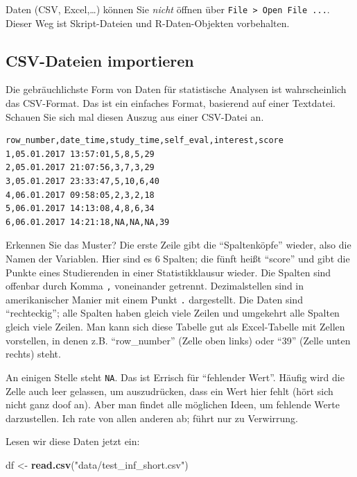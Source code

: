 \documentclass[12pt,ngerman,]{book}
\makeatletter
\newenvironment{Shaded}{\begin{snugshade}}{\end{snugshade}}
\newcommand{\KeywordTok}[1]{\textcolor[rgb]{0.13,0.29,0.53}{\textbf{{#1}}}}
\newcommand{\StringTok}[1]{\textcolor[rgb]{0.31,0.60,0.02}{{#1}}}
\newcommand{\NormalTok}[1]{{#1}}
\newenvironment{kframe}{%
\medskip{}
\setlength{\fboxsep}{.8em}
 \def\at@end@of@kframe{}%
 \ifinner\ifhmode%
  \def\at@end@of@kframe{\end{minipage}}%
  \begin{minipage}{\columnwidth}%
 \fi\fi%
 \def\FrameCommand##1{\hskip\@totalleftmargin \hskip-\fboxsep
 \colorbox{shadecolor}{##1}\hskip-\fboxsep
     \hskip-\linewidth \hskip-\@totalleftmargin \hskip\columnwidth}%
 \MakeFramed {\advance\hsize-\width
   \@totalleftmargin\z@ \linewidth\hsize
   \@setminipage}}%
 {\par\unskip\endMakeFramed%
 \at@end@of@kframe}
\renewenvironment{Shaded}{\begin{kframe}}{\end{kframe}}
\let\BeginKnitrBlock\begin \let\EndKnitrBlock\end
\makeatother
\begin{document}
\BeginKnitrBlock{rmdcaution}
Daten (CSV, Excel,\ldots{}) können Sie \emph{nicht} öffnen über
\texttt{File\ \textgreater{}\ Open\ File\ ...}. Dieser Weg ist
Skript-Dateien und R-Daten-Objekten vorbehalten.
\EndKnitrBlock{rmdcaution}

\subsection{CSV-Dateien importieren}\label{csv-dateien-importieren}

Die gebräuchlichste Form von Daten für statistische Analysen ist
wahrscheinlich das CSV-Format. Das ist ein einfaches Format, basierend
auf einer Textdatei. Schauen Sie sich mal diesen Auszug aus einer
CSV-Datei an.

\begin{verbatim}
row_number,date_time,study_time,self_eval,interest,score
1,05.01.2017 13:57:01,5,8,5,29
2,05.01.2017 21:07:56,3,7,3,29
3,05.01.2017 23:33:47,5,10,6,40
4,06.01.2017 09:58:05,2,3,2,18
5,06.01.2017 14:13:08,4,8,6,34
6,06.01.2017 14:21:18,NA,NA,NA,39
\end{verbatim}

Erkennen Sie das Muster? Die erste Zeile gibt die ``Spaltenköpfe''
wieder, also die Namen der Variablen. Hier sind es 6 Spalten; die fünft
heißt ``score'' und gibt die Punkte eines Studierenden in einer
Statistikklausur wieder. Die Spalten sind offenbar durch Komma
\texttt{,} voneinander getrennt. Dezimalstellen sind in amerikanischer
Manier mit einem Punkt \texttt{.} dargestellt. Die Daten sind
``rechteckig''; alle Spalten haben gleich viele Zeilen und umgekehrt
alle Spalten gleich viele Zeilen. Man kann sich diese Tabelle gut als
Excel-Tabelle mit Zellen vorstellen, in denen z.B. ``row\_number''
(Zelle oben links) oder ``39'' (Zelle unten rechts) steht.

An einigen Stelle steht \texttt{NA}. Das ist Errisch für ``fehlender
Wert''. Häufig wird die Zelle auch leer gelassen, um auszudrücken, dass
ein Wert hier fehlt (hört sich nicht ganz doof an). Aber man findet alle
möglichen Ideen, um fehlende Werte darzustellen. Ich rate von allen
anderen ab; führt nur zu Verwirrung.

Lesen wir diese Daten jetzt ein:

\begin{Shaded}
\begin{Highlighting}[]
\NormalTok{df <-}\StringTok{ }\KeywordTok{read.csv}\NormalTok{(}\StringTok{"data/test_inf_short.csv"}\NormalTok{)}
\end{Highlighting}
\end{Shaded}
\end{document}
